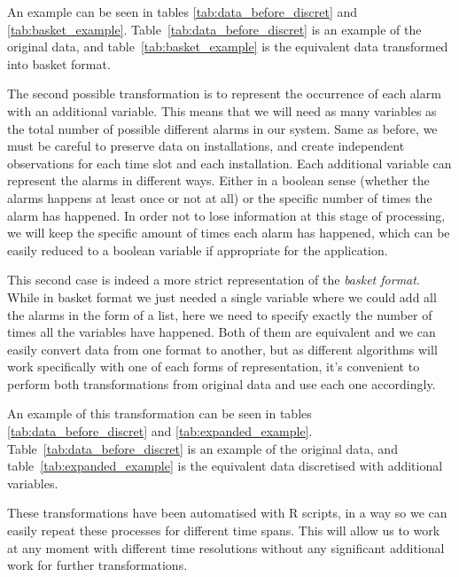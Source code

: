 \documentclass[a4paper,12pt]{article}
\begin{document}
An example can be seen in tables \ref{tab:data_before_discret} and \ref{tab:basket_example}. Table~\ref{tab:data_before_discret} is an example of the original data, and table~\ref{tab:basket_example} is the equivalent data transformed into basket format.

The second possible transformation is to represent the occurrence of each alarm with an additional variable. This means that we will need as many variables as the total number of possible different alarms in our system. Same as before, we must be careful to preserve data on installations, and create independent observations for each time slot and each installation. Each additional variable can represent the alarms in different ways. Either in a boolean sense (whether the alarms happens at least once or not at all) or the specific number of times the alarm has happened. In order not to lose information at this stage of processing, we will keep the specific amount of times each alarm has happened, which can be easily reduced to a boolean variable if appropriate for the application.

This second case is indeed a more strict representation of the \emph{basket format}. While in basket format we just needed a single variable where we could add all the alarms in the form of a list, here we need to specify exactly the number of times all the variables have happened. Both of them are equivalent and we can easily convert data from one format to another, but as different algorithms will work specifically with one of each forms of representation, it's convenient to perform both transformations from original data and use each one accordingly.

An example of this transformation can be seen in tables \ref{tab:data_before_discret} and \ref{tab:expanded_example}. Table~\ref{tab:data_before_discret} is an example of the original data, and table~\ref{tab:expanded_example} is the equivalent data discretised with additional variables.

These transformations have been automatised with R scripts, in a way so we can easily repeat these processes for different time spans. This will allow us to work at any moment with different time resolutions without any significant additional work for further transformations.
\end{document}
